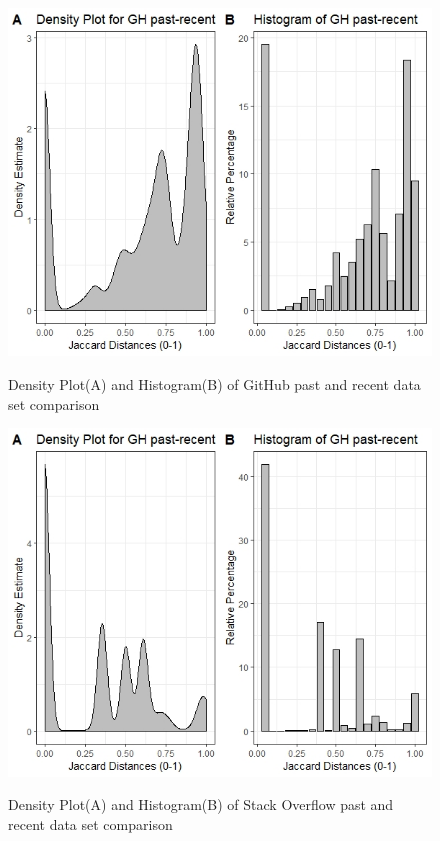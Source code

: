         \begin{figure}
          \centering
          \includegraphics[width=\textwidth]{figures/GH_past-recent.jpeg}\\
          \caption{Density Plot(A) and Histogram(B) of GitHub past and recent data set comparison}
          \label{fig:GH_past_recent}
        \end{figure}
        
        \begin{figure}
          \centering
          \includegraphics[width=\textwidth]{figures/SO_past-recent.jpeg}\\
          \caption{Density Plot(A) and Histogram(B) of Stack Overflow past and recent data set comparison}
          \label{fig:SO_past_recent}
        \end{figure}
        
